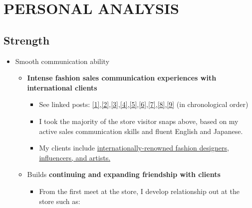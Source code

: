 \documentclass[a4paper,10pt]{extarticle}
\begin{document}
\section*{PERSONAL ANALYSIS}
\subsection*{Strength}
\begin{itemize}
    \item Smooth communication ability
          \begin{itemize}
              \item \textbf{Intense fashion sales communication experiences with international clients}
                    \begin{itemize}
                        \item See linked posts: \href{https://www.instagram.com/p/C47FInpLIux/?utm_source=ig_web_copy_link&igsh=MzRlODBiNWFlZA==}{[1]},\href{https://www.instagram.com/p/C5aQcCALU54/?utm_source=ig_web_copy_link&igsh=MzRlODBiNWFlZA==}{[2]},\href{https://www.instagram.com/p/C58A9wprDEQ/?utm_source=ig_web_copy_link&igsh=MzRlODBiNWFlZA==}{[3]},\href{https://www.instagram.com/p/C7BDa1HLDih/?utm_source=ig_web_copy_link&igsh=MzRlODBiNWFlZA==}{[4]},\href{https://www.instagram.com/p/C8VwTsfKz-k/?utm_source=ig_web_copy_link&igsh=MzRlODBiNWFlZA==}{[5]},\href{https://www.instagram.com/p/C9hJyLhpWOw/?utm_source=ig_web_copy_link&igsh=MzRlODBiNWFlZA==}{[6]},\href{https://www.instagram.com/p/C_ZoCo2pVOI/?utm_source=ig_web_copy_link&igsh=MzRlODBiNWFlZA==}{[7]},\href{https://www.instagram.com/p/DAQP1_tJIwg/?utm_source=ig_web_copy_link&igsh=MzRlODBiNWFlZA==}{[8]},\href{https://www.instagram.com/p/DBXvsyGzFNj/?utm_source=ig_web_copy_link&igsh=MzRlODBiNWFlZA==}{[9]} (in chronological order)
                        \item I took the majority of the store visitor snaps above, based on my active sales communication skills and fluent English and Japanese.
                        \item My clients include \ul{internationally-renowned fashion designers, influencers, and artists.}
                    \end{itemize}
              \item Builds \textbf{continuing and expanding friendship with clients}
                    \begin{itemize}
                        \item From the first meet at the store, I develop relationship out at the store such as:

\end{itemize}
\end{itemize}
\end{itemize}
\end{document}
